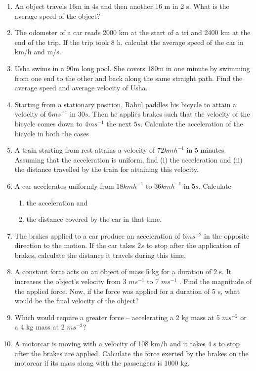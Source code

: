 \renewcommand{\theequation}{\theenumi}
\begin{enumerate}[label=\arabic*.,ref=\thesection.\theenumi]
%
%
\item An object travels 16m in 4s and then another 16 m in 2 s. What is the average speed of the object?
\item The odometer of a car reads 2000 km at the start of a tri and 2400 km at the end of the trip.  If the trip took 8 h, calculat the average speed of the car in km/h and m/s.
\item Usha swims in a 90m long pool.  She covers 180m in one minute by swimming from one end to the other and back along the same straight path.  Find the average speed and average velocity of Usha.
\item Starting from a stationary position, Rahul paddles his bicycle to
attain a velocity of $6 m s^{-1}$ in $30 s$. Then
he applies brakes such that the velocity of the bicycle comes down to $4 m s^{-1}$
the next $5 s$. Calculate the acceleration of the bicycle in both the cases
%
\item A train starting from rest attains a velocity of $72 km h^{-1}$
in
5 minutes. Assuming that the acceleration is uniform, find (i) the acceleration and (ii) the distance travelled by the train for attaining this velocity.
%
\item A car accelerates uniformly from $18 km h
^{-1}$ to $36 km h^{-1}$ in $5 s$. 
Calculate 
\begin{enumerate}
\item the acceleration and 
\item  the distance covered by the car in that time.
\end{enumerate}
%
\item The brakes applied to a car produce an acceleration of $6 m s^{-2}$
in
the opposite direction to the motion. If the car takes $2 s$ to stop after the application of brakes, calculate the distance it travels during this time.
%
\item A constant force acts on an object of mass 5 kg for a duration of 2 s. It increases the object’s velocity from 3 $m s^{-1}$
to 7 $m s^{-1}$ . Find the
magnitude of the applied force. Now, if the force was applied for a duration of 5 s, what would be the final velocity of the object?
\item Which would require a greater force -- accelerating a 2 kg mass at 5 $m s^{-2}$
or a 4 kg mass at 2 $m s^{-2}$?
\item A motorcar is moving with a velocity of 108 km/h and it takes 4 s to stop after the brakes are applied. Calculate the force exerted by the brakes on the motorcar if its mass along with the passengers is 1000 kg.

\end{enumerate}
